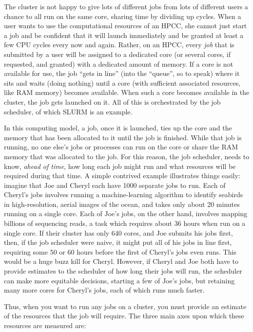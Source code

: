 \documentclass[]{krantz}
\begin{document}
The cluster is not happy to give lots of different jobs
from lots of different users a chance to all run on the same core, sharing time by dividing up cycles.
When a user wants to use the computational resources of an HPCC,
she cannot just start a job and be confident that it will launch immediately and be granted
at least a few CPU cycles every now and again. Rather, on an HPCC, every \emph{job} that is submitted
by a user will be assigned to a dedicated core (or several cores, if requested, and granted)
with a dedicated amount of memory.
If a core is not available for use, the job ``gets in line'' (into the ``queue'', so to speak)
where it sits and waits (doing nothing) until a core
(with sufficient associated resources, like RAM memory) becomes available. When such a core
becomes available in the cluster, the job gets launched on it. All of this is orchestrated by the job scheduler,
of which SLURM is an example.

In this computing model, a job, once it is launched, ties up the core and the memory
that has been allocated to it until the job is finished. While that job is running, no one
else's jobs or processes can run on the core or share the RAM memory that was allocated to the job.
For this reason, the job scheduler, needs to know, \emph{ahead of time}, how long each job might run and
what resources will be required during that time. A simple contrived example illustrates things easily:
imagine that Joe and Cheryl each have 1000 separate jobs to run. Each of Cheryl's jobs involves running
a machine-learning algorithm to identify seabirds in high-resolution, aerial images of the ocean, and
takes only about 20 minutes running on a single core. Each of Joe's jobs, on the other hand, involves mapping billions of
sequencing reads, a task which requires about 36 hours when run on a single core.
If their cluster has only 640 cores, and Joe submits his jobs first,
then, if the job scheduler were naive, it might put all of his jobs in line first, requiring some 50 or 60 hours
before the first of Cheryl's jobs even runs. This would be a huge buzz kill for Cheryl.
However, if Cheryl and Joe both have to provide estimates to the scheduler of how
long their jobs will run, the scheduler can make more equitable decisions, starting a few of Joe's jobs, but retaining
many more cores for Cheryl's jobs, each of which runs much faster.

Thus, when you want to run any jobs on a cluster, you must provide an estimate of the resources
that the job will require. The three main axes upon which these resources are measured are:
\end{document}
